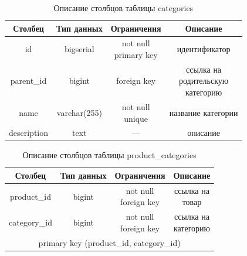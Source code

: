 \begin{table}[H]
    \caption{Описание столбцов таблицы categories}
    \label{tbl:t_categories}
    \rpzcompacttable
    \begin{tabular}[]{|c|c|c|c|}
        \hline
        \textbf{Столбец} & \textbf{Тип данных} & \textbf{Ограничения} & \textbf{Описание} \\ \hline
        id & bigserial & \makecell{not null \\ primary key} & идентификатор \\ \hline
        parent\_id & bigint & foreign key & \makecell{ссылка на\\родительскую\\категорию} \\ \hline
        name & varchar(255) & \makecell{not null \\ unique} & название категории \\ \hline
        description & text & --- & описание \\ \hline
    \end{tabular}
\end{table}

\begin{table}[H]
    \caption{Описание столбцов таблицы product\_categories}
    \label{tbl:t_product_categories}
    \rpzcompacttable
    \begin{tabular}[]{|c|c|c|c|}
        \hline
        \textbf{Столбец} & \textbf{Тип данных} & \textbf{Ограничения} & \textbf{Описание} \\ \hline
        product\_id & bigint & \makecell{not null \\ foreign key} & \makecell{ссылка на\\товар} \\ \hline
        category\_id & bigint & \makecell{not null \\ foreign key} & \makecell{ссылка на\\категорию} \\ \hline
        \multicolumn{4}{|c|}{primary key (product\_id, category\_id)} \\ \hline
    \end{tabular}
\end{table}

